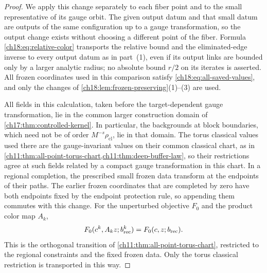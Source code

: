 \begin{proof}
We apply this change separately to each fiber point and to the small representative of its gauge orbit. The given output datum and that small datum are outputs of the same configuration up to a gauge transformation, so the output change exists without choosing a different point of the fiber. Formula \eqref{ch18:eq:relative-color} transports the relative bound and the eliminated-edge inverse to every output datum as in part~(1), even if its output links are bounded only by a larger analytic radius; no absolute bound $r/2$ on its iterates is asserted. All frozen coordinates used in this comparison satisfy \eqref{ch18:eq:all-saved-values}, and only the changes of \cref{ch18:lem:frozen-preserving}(1)--(3) are used.

All fields in this calculation, taken before the target-dependent gauge transformation, lie in the common larger construction domain of \cref{ch17:thm:controlled-kernel}. In particular, the backgrounds at block boundaries, which need not be of order $M^{-s}\rho_{\mathrm{cl}}$, lie in that domain. The torus classical values used there are the gauge-invariant values on their common classical chart, as in \cref{ch11:thm:all-point-torus-chart,ch11:thm:deep-buffer-law}, so their restrictions agree at such fields related by a compact gauge transformation in this chart. In a regional completion, the prescribed small frozen data transform at the endpoints of their paths. The earlier frozen coordinates that are completed by zero have both endpoints fixed by the endpoint protection rule, so appending them commutes with this change. For the unperturbed objective $F_0$ and the product color map $A_k$,
\begin{equation}\label{ch18:eq:unperturbed-covariance}
 F_0(c^k,A_kz;b_{\mathrm{rec}}^k)=F_0(c,z;b_{\mathrm{rec}}).
\end{equation}
This is the orthogonal transition of \cref{ch11:thm:all-point-torus-chart}, restricted to the regional constraints and the fixed frozen data. Only the torus classical restriction is transported in this way.


\end{proof}
